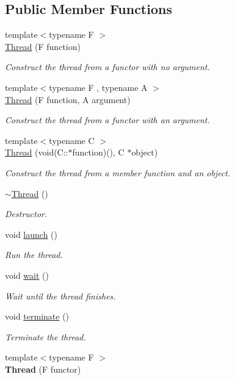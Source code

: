 \subsection*{Public Member Functions}
\begin{DoxyCompactItemize}
\item 
{\footnotesize template$<$typename F $>$ }\\\hyperlink{classsf_1_1Thread_a4cc65399bbb111cf8132537783b8e96c}{Thread} (F function)
\begin{DoxyCompactList}\small\item\em Construct the thread from a functor with no argument. \end{DoxyCompactList}\item 
{\footnotesize template$<$typename F , typename A $>$ }\\\hyperlink{classsf_1_1Thread_a719b2cc067d92d52c35064a49d850a53}{Thread} (F function, A argument)
\begin{DoxyCompactList}\small\item\em Construct the thread from a functor with an argument. \end{DoxyCompactList}\item 
{\footnotesize template$<$typename C $>$ }\\\hyperlink{classsf_1_1Thread_aa9f473c8cbb078900c62b1fd14a83a34}{Thread} (void(C\-::$\ast$function)(), C $\ast$object)
\begin{DoxyCompactList}\small\item\em Construct the thread from a member function and an object. \end{DoxyCompactList}\item 
\hyperlink{classsf_1_1Thread_af77942fc1730af7c31bc4c3a913a9c1d}{$\sim$\-Thread} ()
\begin{DoxyCompactList}\small\item\em Destructor. \end{DoxyCompactList}\item 
void \hyperlink{classsf_1_1Thread_a74f75a9e86e1eb47479496314048b5f6}{launch} ()
\begin{DoxyCompactList}\small\item\em Run the thread. \end{DoxyCompactList}\item 
void \hyperlink{classsf_1_1Thread_a724b1f94c2d54f84280f2f78bde95fa0}{wait} ()
\begin{DoxyCompactList}\small\item\em Wait until the thread finishes. \end{DoxyCompactList}\item 
void \hyperlink{classsf_1_1Thread_ad6b205d4f1ce38b8d44bba0f5501477c}{terminate} ()
\begin{DoxyCompactList}\small\item\em Terminate the thread. \end{DoxyCompactList}\item 
\hypertarget{classsf_1_1Thread_a00b88f036de66eb63765f4c12ceb6870}{{\footnotesize template$<$typename F $>$ }\\{\bfseries Thread} (F functor)}\label{classsf_1_1Thread_a00b88f036de66eb63765f4c12ceb6870}


\end{DoxyCompactItemize}
